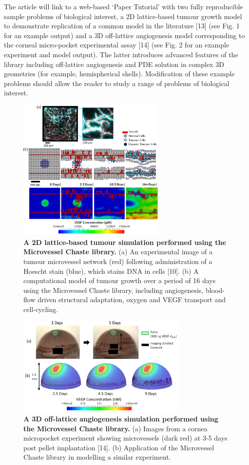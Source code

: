 \documentclass[fullpage,11pt]{article}
\begin{document}
The article will link to a web-based ‘Paper Tutorial’ with two fully reproducible sample problems of biological interest, a 2D lattice-based tumour growth model to demonstrate replication of a common model in the literature [13] (see Fig. 1 for an example output) and a 3D off-lattice angiogenesis model corresponding to the corneal micro-pocket experimental assay [14] (see Fig. 2 for an example experiment and model output). The latter introduces advanced features of the library including off-lattice angiogenesis and PDE solution in complex 3D geometries (for example, hemispherical shells). Modification of these example problems should allow the reader to study a range of problems of biological interest.

\begin{figure}[!h]
\centering
\includegraphics[width=0.65\textwidth]{Fig3.png}
\caption{{\bf A 2D lattice-based tumour simulation performed using the Microvessel Chaste library.}
(a) An experimental image of a tumour microvessel network (red) following administration of a Hoescht stain (blue), which stains DNA in cells [10]. (b) A computational model of tumour growth over a period of 16 days using the Microvessel Chaste library, including angiogenesis, blood-flow driven structural adaptation, oxygen and VEGF transport and cell-cycling.}
\label{fig3}
\end{figure}

\begin{figure}[!h]
\centering
\includegraphics[width=0.75\textwidth]{Fig4.png}
\caption{{\bf A 3D off-lattice angiogenesis simulation performed using the Microvessel Chaste library.}
(a) Images from a cornea micropocket experiment showing microvessels (dark red) at 3-5 days post pellet implantation [14]. (b) Application of the Microvessel Chaste library in modelling a similar experiment.}
\label{fig4}
\end{figure}
\end{document}
